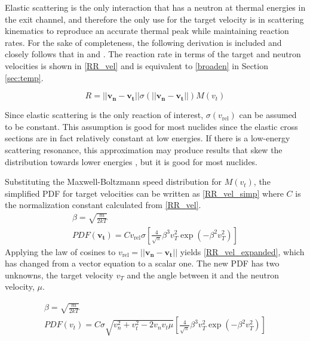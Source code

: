 Elastic scattering is the only interaction that has a neutron at thermal energies in the exit channel, and therefore the only use for the target velocity is in scattering kinematics to reproduce an accurate thermal peak while maintaining reaction rates.  For the sake of completeness, the following derivation is included and closely follows that in \cite{openmc} and \cite{gelbard}.  The reaction rate in terms of the target and neutron velocities is shown in \eqref{RR_vel} and is equivalent to \eqref{broaden} in Section \ref{sec:temp}.

\begin{equation}
\label{RR_vel}
R = ||\boldsymbol{v_n}-\boldsymbol{v_t}|| \sigma(||\boldsymbol{v_n}-\boldsymbol{v_t}||) M(v_t)
\end{equation}

Since elastic scattering is the only reaction of interest, $\sigma(v_\mathrm{rel})$ can be assumed to be constant.  This assumption is good for most nuclides since the elastic cross sections are in fact relatively constant at low energies.  If there is a low-energy scattering resonance, this approximation may produce results that skew the distribution towards lower energies \cite{openmc}, but it is good for most nuclides.  

Substituting the Maxwell-Boltzmann speed distribution for $M(v_t)$, the simplified PDF for target velocities can be written as \eqref{RR_vel_simp} where $C$ is the normalization constant calculated from \eqref{RR_vel}.
%
\begin{equation}
\label{RR_vel_simp}
\begin{gathered}
\beta = \sqrt{\frac{m}{2kT}} \\
PDF(\boldsymbol{v_t}) = C v_\mathrm{rel} \sigma \left[   \frac{4}{\sqrt{\pi}} \beta^3 v_T^2  \exp (- \beta^2  v_T^2 )      \right]
\end{gathered}
\end{equation}
Applying the law of cosines to $v_\mathrm{rel} = ||\boldsymbol{v_n}-\boldsymbol{v_t}||$ yields \eqref{RR_vel_expanded}, which has changed from a vector equation to a scalar one.   The new PDF has two unknowns, the target velocity $v_T$ and the angle between it and the neutron velocity, $\mu$.

\begin{equation}
\label{RR_vel_expanded}
\begin{gathered}
\beta = \sqrt{\frac{m}{2kT}} \\
PDF(v_t) = C \sigma  \sqrt{v_n^2+v_t^2-2 v_n v_t \mu} \left[   \frac{4}{\sqrt{\pi}} \beta^3 v_T^2  \exp ( -\beta^2  v_T^2 )      \right]
\end{gathered}
\end{equation}

